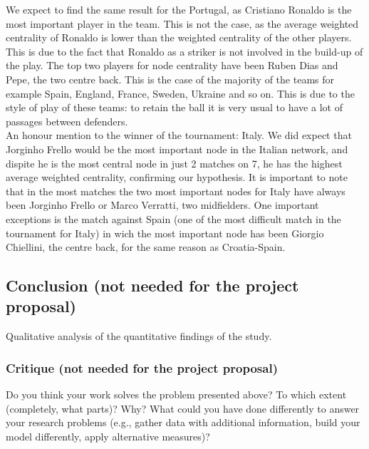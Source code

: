 \documentclass[12pt, a4paper]{article}
\begin{document}
We expect to find the same result for the Portugal, as Cristiano Ronaldo is the most important player in the team. This is not the case, as the average weighted centrality of Ronaldo is lower than the weighted centrality of the other players. This is due to the fact that Ronaldo as a striker is not involved in the build-up of the play. The top two players for node centrality have been Ruben Dias and Pepe, the two centre back. This is the case of the majority of the teams for example Spain, England, France, Sweden, Ukraine and so on. This is due to the style of play of these teams: to retain the ball it is very usual to have a lot of passages between defenders. \\
An honour mention to the winner of the tournament: Italy. We did expect that Jorginho Frello would be the most important node in the Italian network, and dispite he is the most central node in just 2 matches on 7, he has the highest average weighted centrality, confirming our hypothesis. It is important to note that in the most matches the two most important nodes for Italy have always been Jorginho Frello or Marco Verratti, two midfielders. One important exceptions is the match against Spain (one of the most difficult match in the tournament for Italy) in wich the most important node has been Giorgio Chiellini, the centre back, for the same reason as Croatia-Spain. \\







\subsection{Conclusion (not needed for the project proposal)}
Qualitative analysis of the quantitative findings of the study.

\subsubsection{Critique (not needed for the project proposal)}
\label{critique-not-needed-for-the-project-proposal}

Do you think your work solves the problem presented above? To which
extent (completely, what parts)? Why? What could you have done
differently to answer your research problems (e.g., gather data with
additional information, build your model differently, apply alternative
measures)?
\end{document}
